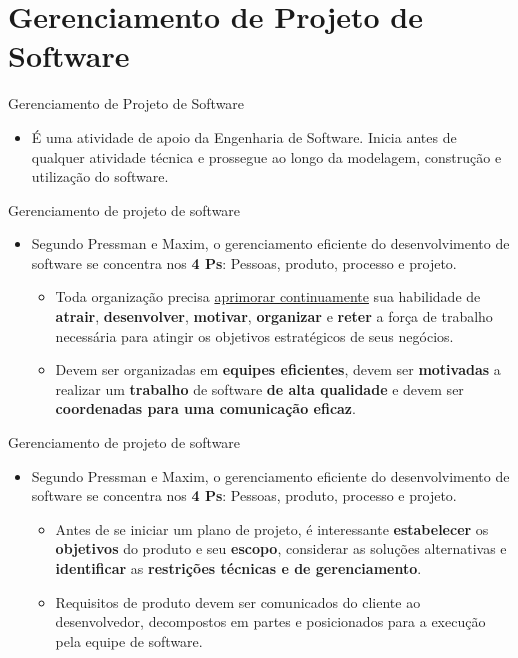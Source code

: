 \documentclass{beamer}
\begin{document}
\section{Gerenciamento de Projeto de Software}

\begin{frame}{Gerenciamento de Projeto de Software}
	\begin{itemize}
		\justifying
		\item É uma atividade de apoio da Engenharia de Software. Inicia antes de qualquer atividade técnica e prossegue ao longo da modelagem, construção e utilização do software.
	\end{itemize}
\end{frame}

\begin{frame}{Gerenciamento de projeto de software}
	\begin{itemize}
		\justifying
		\item Segundo Pressman e Maxim, o \alert<3>{gerenciamento} eficiente do desenvolvimento de software se concentra nos \textbf{4 Ps}: \alert<2-3>{Pessoas}, produto, processo e projeto.
		\begin{itemize}
			\justifying
			\item<2> Toda organização precisa \underline{aprimorar continuamente} sua habilidade de \textbf{atrair}, \textbf{desenvolver}, \textbf{motivar}, \textbf{organizar} e \textbf{reter} a força de trabalho necessária para atingir os objetivos estratégicos de seus negócios.
			\item<3> Devem ser organizadas em \textbf{equipes eficientes}, devem ser \textbf{motivadas} a realizar um \textbf{trabalho} de software \textbf{de alta qualidade} e devem ser \textbf{coordenadas para uma comunicação eficaz}.
		\end{itemize}
	\end{itemize}
\end{frame}

\begin{frame}{Gerenciamento de projeto de software}
	\begin{itemize}
		\justifying
		\item Segundo Pressman e Maxim, o \alert<2>{gerenciamento} eficiente do desenvolvimento de software se concentra nos \textbf{4 Ps}: Pessoas, \alert<1-2>{produto}, processo e projeto.
		\begin{itemize}
			\justifying
			\item<1> Antes de se iniciar um plano de projeto, é interessante \textbf{estabelecer} os \textbf{objetivos} do produto e seu \textbf{escopo}, considerar as soluções alternativas e \textbf{identificar} as \textbf{restrições técnicas e de gerenciamento}.
			\item<2> Requisitos de produto devem ser comunicados do cliente ao desenvolvedor, decompostos em partes e posicionados para a execução pela equipe de software.
		\end{itemize}
	\end{itemize}
\end{frame}
\end{document}
